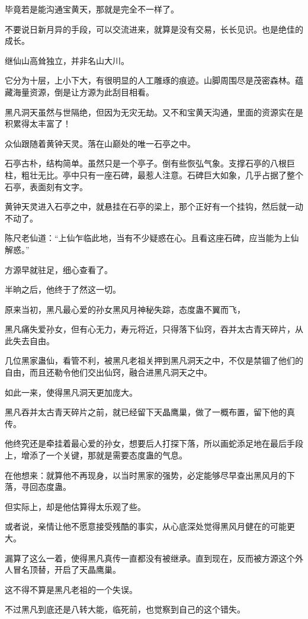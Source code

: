 \begin{this_body}
毕竟若是能沟通宝黄天，那就是完全不一样了。

不要说日新月异的手段，可以交流进来，就算是没有交易，长长见识。也是绝佳的成长。

继仙山高耸独立，并非名山大川。

它分为十层，上小下大，有很明显的人工雕琢的痕迹。山脚周围尽是茂密森林。蕴藏海量资源，倒是让方源为此刮目相看。

黑凡洞天虽然与世隔绝，但因为无灾无劫。又不和宝黄天沟通，里面的资源实在是积累得太丰富了！

众仙跟随着黄钟天灵。落在山巅处的唯一石亭之中。

石亭古朴，结构简单。虽然只是一个亭子。倒有些恢弘气象。支撑石亭的八根巨柱，粗壮无比。亭中只有一座石碑，最惹人注意。石碑巨大如象，几乎占据了整个石亭，表面刻有文字。

黄钟天灵进入石亭之中，就悬挂在石亭的梁上，那个正好有一个挂钩，然后就一动不动了。

陈尺老仙道：“上仙乍临此地，当有不少疑惑在心。且看这座石碑，应当能为上仙解惑。”

方源早就驻足，细心查看了。

半晌之后，他终于了然这一切。

原来当初，黑凡最心爱的孙女黑风月神秘失踪，态度蛊不翼而飞，

黑凡痛失爱孙女，但有心无力，寿元将近，只得落下仙窍，吞并太古青天碎片，从此失去自由。

几位黑家蛊仙，看管不利，被黑凡老祖关押到黑凡洞天之中，不仅是禁锢了他们的自由，而且还勒令他们交出仙窍，融合进黑凡洞天之中。

如此一来，使得黑凡洞天更加庞大。

黑凡吞并太古青天碎片之前，就已经留下天晶鹰巢，做了一概布置，留下他的真传。

他终究还是牵挂着最心爱的孙女，想要后人打探下落，所以画蛇添足地在最后手段上，增添了一个关键，那就是需要态度蛊的气息。

在他想来：就算他不再现身，以当时黑家的强势，必定能够尽早查出黑风月的下落，寻回态度蛊。

但实际上，却是他估算得太乐观了些。

或者说，亲情让他不愿意接受残酷的事实，从心底深处觉得黑风月健在的可能更大。

漏算了这么一着，使得黑凡真传一直都没有被继承。直到现在，反而被方源这个外人冒名顶替，开启了天晶鹰巢。

这不得不算是黑凡老祖的一个失误。

不过黑凡到底还是八转大能，临死前，也觉察到自己的这个错失。


\end{this_body}
